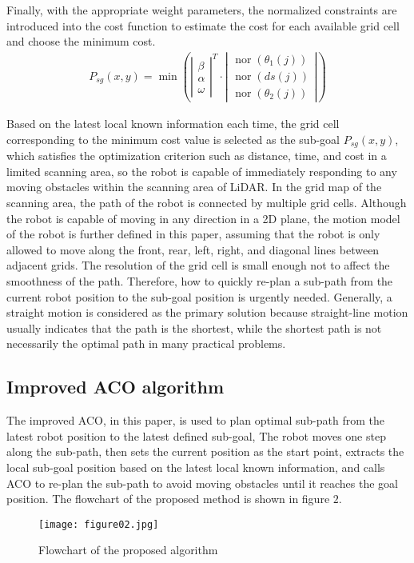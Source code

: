 \documentclass{iosart2c}
\begin{document}
Finally, with the appropriate weight parameters, the normalized constraints are introduced into the cost function to estimate the cost for each available grid cell and choose the minimum cost.
\begin{equation}
\begin{split}
P_{s g}(x, y)=\min \left(\left|\begin{array}{l}
\beta \\
\alpha \\
\omega
\end{array}\right|^{T} \cdot\left|\begin{array}{l}
\operatorname{nor}\left(\theta_{1}(j)\right) \\
\operatorname{nor}(d s(j)) \\
\operatorname{nor}\left(\theta_{2}(j)\right)
\end{array}\right|\right) 
\end{split}
\end{equation}

Based on the latest local known information each time, the grid cell corresponding to the minimum cost value is selected as the sub-goal $P_{s g}(x,y)$, which satisfies the optimization criterion such as distance, time, and cost in a limited scanning area, so the robot is capable of immediately responding to any moving obstacles within the scanning area of LiDAR. In the grid map of the scanning area, the path of the robot is connected by multiple grid cells. Although the robot is capable of moving in any direction in a 2D plane, the motion model of the robot is further defined in this paper, assuming that the robot is only allowed to move along the front, rear, left, right, and diagonal lines between adjacent grids. The resolution of the grid cell is small enough not to affect the smoothness of the path. Therefore, how to quickly re-plan a sub-path from the current robot position to the sub-goal position is urgently needed. Generally, a straight motion is considered as the primary solution because straight-line motion usually indicates that the path is the shortest, while the shortest path is not necessarily the optimal path in many practical problems.


\subsection{Improved ACO algorithm}\label{s3.3}

The improved ACO, in this paper, is used to plan optimal sub-path from the latest robot position to the latest defined sub-goal, The robot moves one step along the sub-path, then sets the current position as the start point, extracts the local sub-goal position based on the latest local known information, and calls ACO to re-plan the sub-path to avoid moving obstacles until it reaches the goal position. The flowchart of the proposed method is shown in figure $2$. 
\begin{figure}[ht] %
\vspace{-0.2cm} 
\setlength{\abovecaptionskip}{0.1cm}  %
\texttt{[image: figure02.jpg]}
\caption{ Flowchart of the proposed algorithm}\label{f3}
\end{figure}
\end{document}
